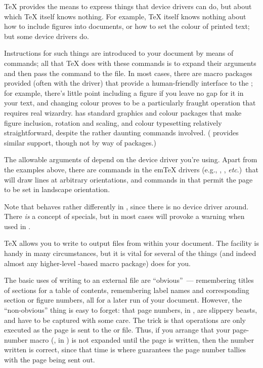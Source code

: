 
\TeX{} provides the means to express things that device drivers can
do, but about which \TeX{} itself knows nothing.  For example, \TeX{}
itself knows nothing about how to include \PS{} figures into
documents, or how to set the colour of printed text; but some device
drivers do.

Instructions for such things are introduced to your document by means
of  commands; all that \TeX{} does with these commands is
to expand their 
arguments and then pass the command to the  file.  In most
cases, there are macro packages provided (often with the driver) that
provide a human-friendly interface to the ; for example,
there's little point including a figure if you leave no gap for it in
your text, and changing colour proves to be a particularly fraught
operation that requires real wizardry.  \LaTeXe{}
has standard graphics and colour packages that make figure inclusion,
rotation and scaling, and colour typesetting relatively
straightforward, despite the rather daunting  commands
involved.  (\CONTeXT{} provides similar support, though not by way of
packages.)

The allowable arguments of  depend on the device driver
you're using.  Apart from the examples above, there are 
commands in the em\TeX{} drivers (e.g., , ,
\emph{etc}.)~that will draw lines at arbitrary orientations, and
commands in  that permit the page to be set in
landscape orientation.

Note that  behaves rather differently in \PDFTeX{}, since
there is no device driver around.  There \emph{is} a concept of
 specials, but in most cases  will provoke a
warning when used in \PDFTeX{}.


\TeX{} allows you to write to output files from within your document.
The facility is handy in many circumstances, but it is vital for
several of the things \latex{} (and indeed almost any higher-level
\tex{}-based macro package) does for you.

The basic uses of writing to an external file are ``obvious''~---
remembering titles of sections for a table of contents, remembering
label names and corresponding section or figure numbers, all for a
later run of your document.  However, the ``non-obvious'' thing is
easy to forget: that page numbers, in \tex{}, are slippery beasts, and
have to be captured with some care.  The trick is that 
operations are only executed as the page is sent to the 
or  file.  Thus, if you arrange that your page-number macro
(, in \latex{}) is not expanded until the page is
written, then the number written is correct, since that time is where
\tex{} guarantees the page number tallies with the page being sent
out.


